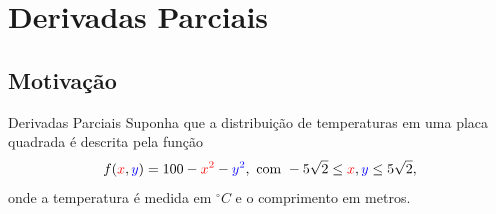 \section{Derivadas Parciais}

\subsection*{Motivação}
\begin{frame}[label=der-parciais]{Derivadas Parciais}
Suponha que a distribuição de temperaturas em uma placa quadrada é descrita pela função
\[f({\color{red}x},{\color{blue}y})=100-{\color{red}x^2}-{\color{blue}y^2}, \text{ com } -5\sqrt{2}\leq {\color{red}x},{\color{blue}y}\leq 5\sqrt{2},\]
onde a temperatura é medida em $^\circ C$ e o comprimento em metros.





\end{frame}
